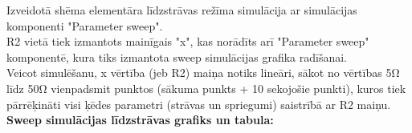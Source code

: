 \documentclass {report}
\begin{document}
\indent Izveidotā shēma elementāra līdzstrāvas režīma simulācija ar simulācijas komponenti "Parameter sweep".\\
R2 vietā tiek izmantots mainīgais "x", kas norādīts arī "Parameter sweep" komponentē, kura tiks izmantota sweep simulācijas grafika radīšanai. \\ Veicot simulēšanu, x vērtība (jeb R2) maiņa notiks lineāri, sākot no vērtības 5Ω līdz 50Ω vienpadsmit punktos (sākuma punkts + 10 sekojošie punkti), kuros tiek pārrēķināti visi ķēdes parametri (strāvas un spriegumi) saistrībā ar R2 maiņu.\\
\textbf{Sweep simulācijas līdzstrāvas grafiks un tabula:}
\\
\end{document}

